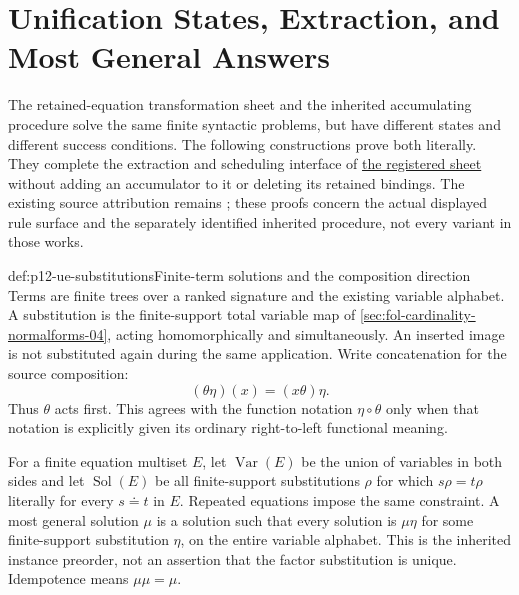\section{Unification States, Extraction, and Most General Answers}
\label{sec:p12-unification-extraction-adequacy}

The retained-equation transformation sheet and the inherited accumulating
procedure solve the same finite syntactic problems, but have different
states and different success conditions. The following constructions prove
both literally. They complete the extraction and scheduling interface of
\hyperref[sheet:unification-first-order]{the registered sheet} without
adding an accumulator to it or deleting its retained bindings. The existing
source attribution remains \cite{MartelliMontanari1982,BaaderSnyder2001};
these proofs concern the actual displayed rule surface and the separately
identified inherited procedure, not every variant in those works.

\begin{hbdefinition}{def:p12-ue-substitutions}{Finite-term solutions and the composition direction}
Terms are finite trees over a ranked signature and the existing variable
alphabet. A substitution is the finite-support total variable map of
\cref{sec:fol-cardinality-normalforms-04}, acting homomorphically and
simultaneously. An inserted image is not substituted again during the
same application. Write concatenation for the source composition:
\[
                    (\theta\eta)(x)=(x\theta)\eta.
\]
Thus \(\theta\) acts first. This agrees with the function notation
\(\eta\circ\theta\) only when that notation is explicitly given its
ordinary right-to-left functional meaning.

For a finite equation multiset \(E\), let \(\operatorname{Var}(E)\)
be the union of variables in both sides and let \(\operatorname{Sol}(E)\)
be all finite-support substitutions \(\rho\) for which
\(s\rho=t\rho\) literally for every \(s\doteq t\) in \(E\).
Repeated equations impose the same constraint. A most general solution
\(\mu\) is a solution such that every solution is \(\mu\eta\)
for some finite-support substitution \(\eta\), on the entire variable
alphabet. This is the inherited instance preorder, not an assertion
that the factor substitution is unique. Idempotence means
\(\mu\mu=\mu\).
\end{hbdefinition}


